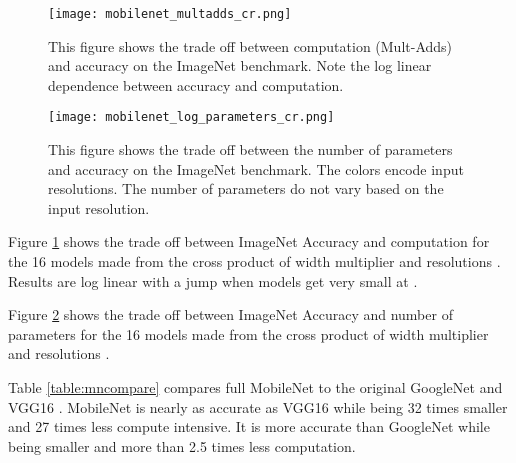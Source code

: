\documentclass[10pt,twocolumn,letterpaper]{article}
\begin{document}
\begin{table}[t]
  \caption{MobileNet Resolution} \centering {}
\end{table}

\begin{figure}
  \texttt{[image: mobilenet\_multadds\_cr.png]}
  \caption{This figure shows the trade off between computation (Mult-Adds) and accuracy on the ImageNet benchmark. Note the log linear dependence between accuracy and computation.}
  \label{fig:mult-add}
\end{figure}

\begin{figure}
  \texttt{[image: mobilenet\_log\_parameters\_cr.png]}
  \caption{This figure shows the trade off between the number of parameters and accuracy on the ImageNet benchmark. The colors encode input resolutions. The number of parameters do not vary based on the input resolution. }
  \label{fig:parameters}
\end{figure}

Figure \ref{fig:mult-add} shows the trade off between ImageNet Accuracy and computation for the 16 models made from the cross product of width multiplier  and resolutions . Results are log linear with a jump when models get very small at .

Figure \ref{fig:parameters} shows the trade off between ImageNet Accuracy and number of parameters for the 16 models made from the cross product of width multiplier  and resolutions . 

Table \ref{table:mncompare} compares full MobileNet to the original GoogleNet \cite{szegedy2015going} and VGG16 \cite{simonyan2014very}. MobileNet is nearly as accurate as VGG16 while being 32 times smaller and 27 times less compute intensive. It is more accurate than GoogleNet while being smaller and more than 2.5 times less computation.
\end{document}
